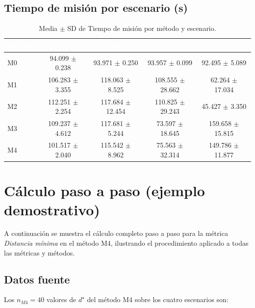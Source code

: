 \documentclass[12pt,a4paper,oneside]{book}
\begin{document}
\subsection{Tiempo de misión por escenario (s)}

\begin{table}[H]
\centering
\small
\caption{Media $\pm$ SD de Tiempo de misión por método y escenario.}
\begin{tabular}{lcccc}
\toprule
\rowcolor{primary}
\textcolor{white}{\textbf{Método}} & \textcolor{white}{\textbf{E1}} & \textcolor{white}{\textbf{E2}} & \textcolor{white}{\textbf{E3}} & \textcolor{white}{\textbf{E4}} \\
\midrule
M0 & 94.099 $\pm$ 0.238 & 93.971 $\pm$ 0.250 & 93.957 $\pm$ 0.099 & 92.495 $\pm$ 5.089 \\
M1 & 106.283 $\pm$ 3.355 & 118.063 $\pm$ 8.525 & 108.555 $\pm$ 28.662 & 62.264 $\pm$ 17.034 \\
M2 & 112.251 $\pm$ 2.254 & 117.684 $\pm$ 12.454 & 110.825 $\pm$ 29.243 & 45.427 $\pm$ 3.350 \\
M3 & 109.237 $\pm$ 4.612 & 117.681 $\pm$ 5.244 & 73.597 $\pm$ 18.645 & 159.658 $\pm$ 15.815 \\
M4 & 101.517 $\pm$ 2.040 & 115.542 $\pm$ 8.962 & 75.563 $\pm$ 32.314 & 149.786 $\pm$ 11.877 \\
\bottomrule
\end{tabular}
\end{table}

\newpage
\section{Cálculo paso a paso (ejemplo demostrativo)}

A continuación se muestra el cálculo completo paso a paso para la métrica \emph{Distancia mínima} en el método M4, ilustrando el procedimiento aplicado a todas las métricas y métodos.

\subsection{Datos fuente}

Los $n_{M4}=40$ valores de $d^\star$ del método M4 sobre los cuatro escenarios son:
\end{document}
